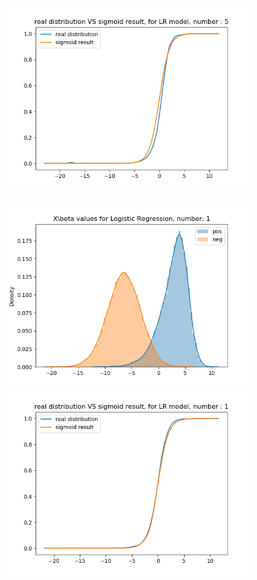 \documentclass{article}
\begin{document}
\begin{figure}[H]
\begin{minipage}{0.19\textwidth}
        \includegraphics[width=0.95\textwidth]{fig/lr/5-2.png}
    \end{minipage}
    \begin{minipage}{0.19\textwidth}
        \centering
        \includegraphics[width=0.95\textwidth]{fig/lr/1.png}
        \includegraphics[width=0.95\textwidth]{fig/lr/1-2.png}

\end{minipage}
\end{figure}
\end{document}
